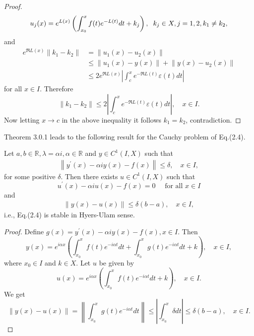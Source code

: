 \documentclass[a4paper,12pt]{report}
\begin{document}
\begin{thm}
\begin{proof}
  $$
 u_{j}(x)=e^{L(x)}\left(\int_{x_{0}}^{x} f(t) e^{-L(t)} d t+k_{j}\right),\hspace{0.2cm} k_{j} \in X, j=1,2, k_{1} \neq k_{2},
 $$
 and
 $$
 \begin{aligned}
 	e^{\Re L(x)}\left\|k_{1}-k_{2}\right\| & =\left\|u_{1}(x)-u_{2}(x)\right\| \\
 	& \le\left\|u_{1}(x)-y(x)\right\|+\left\|y(x)-u_{2}(x)\right\| \\
 	& \le 2 e^{\Re L(x)}\left|\int_{c}^{x} e^{-\Re L(t)} \varepsilon(t) d t\right|
 \end{aligned}
 $$for all $x \in I$. Therefore
$$
 \left\|k_{1}-k_{2}\right\| \le 2\left|\int_{c}^{x} e^{-\Re L(t)} \varepsilon(t) d t\right|, \quad x \in I .
 $$
 Now letting $x \rightarrow c$ in the above inequality it follows $k_{1}=k_{2}$, \linebreak contradiction. 
\end{proof}
\end{thm}
\noindent Theorem 3.0.1 leads to the following result for the Cauchy problem \linebreak of Eq.(2.4).
\begin{thm}
Let $a, b \in \mathbb{R}, \lambda=\alpha i, \alpha \in \mathbb{R}$ and $y \in C^{1}(I, X)$ such that
\begin{eqnarray}
	\left\|y^{\prime}(x)-\alpha i y(x)-f(x)\right\| \le \delta, \quad x \in I,
\end{eqnarray}
for some positive $\delta$. Then there exists $u \in C^{1}(I, X)$ such that $$
u^{\prime}(x)-\alpha i u(x)-f(x)=0 \quad \text { for all } x \in I $$ and
\begin{eqnarray}
	 \|y(x)-u(x)\| \le \delta(b-a), \quad x \in I,
\end{eqnarray}
i.e., Eq.(2.4) is stable in Hyers-Ulam sense. 
\begin{proof}
Define $g(x)=y^{\prime}(x)-\alpha i y(x)-f(x), x \in I$. Then
$$ y(x)=e^{i \alpha x}\left(\int_{x_{0}}^{x} f(t) e^{-i \alpha t} d t+\int_{x_{0}}^{x} g(t) e^{-i \alpha t} d t+k\right), \quad x \in I, $$
where $x_{0} \in I$ and $k \in X$. Let $u$ be given by $$
u(x)=e^{i \alpha x}\left(\int_{x_{0}}^{x} f(t) e^{-i \alpha t} d t+k\right), \quad x \in I . $$
We get
$$ \|y(x)-u(x)\|=\left\|\int_{x_{0}}^{x} g(t) e^{-i \alpha t} d t\right\| \le\left|\int_{x_{0}}^{x} \delta d t\right| \le \delta(b-a), \quad x \in I .
$$	
\end{proof}	
\end{thm}
\end{document}
